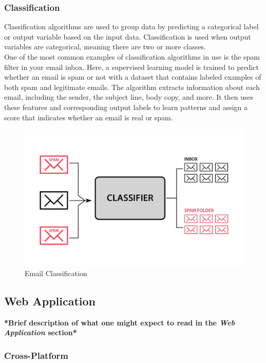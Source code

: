 \subsubsection*{Classification}
\label{subsubsec:classification}

Classification algorithms are used to group data by predicting a categorical label or output variable based on the input data. Classification is used when output variables are categorical, meaning there are two or more classes. \cite{google:supervised-learning} \\

One of the most common examples of classification algorithms in use is the spam filter in your email inbox. Here, a supervised learning model is trained to predict whether an email is spam or not with a dataset that contains labeled examples of both spam and legitimate emails. The algorithm extracts information about each email, including the sender, the subject line, body copy, and more. It then uses these features and corresponding output labels to learn patterns and assign a score that indicates whether an email is real or spam. \cite{google:supervised-learning}

\begin{figure}[h!]
    \centering
    \includegraphics[width=0.75\linewidth]{figures/theory/classification.jpg}
    \caption{Email Classification \cite{analytixlabs:classification}}
    \label{fig:classification}
\end{figure}

\subsection{Web Application}
\label{subsec:web}

\textbf{*Brief description of what one might expect to read in the \textit{Web Application} section*}

\subsubsection*{Cross-Platform}
\label{subsubsec:corss-platform}

